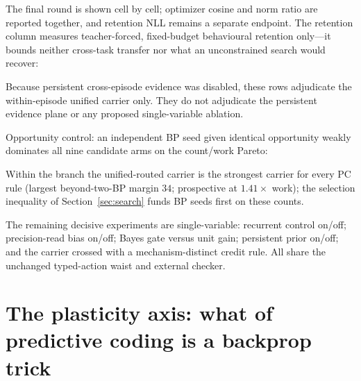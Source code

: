 \documentclass[11pt]{article}
\begin{document}
The final round is shown cell by cell; optimizer cosine and norm ratio are
reported together, and retention NLL remains a separate endpoint. The retention
column measures teacher-forced, fixed-budget behavioural retention only---it bounds
neither cross-task transfer nor what an unconstrained search would recover:
\begin{center}\scriptsize
{}
\end{center}

Because persistent cross-episode evidence was disabled, these rows adjudicate the
within-episode unified carrier only. They do not adjudicate the persistent evidence
plane or any proposed single-variable ablation.

Opportunity control: an independent BP seed given identical opportunity weakly
dominates all nine candidate arms on the count/work Pareto:
\begin{center}\small
{}
\end{center}
Within the branch the unified-routed carrier is the strongest carrier for every PC
rule (largest beyond-two-BP margin $34$; prospective at $1.41\times$ work); the
selection inequality of Section~\ref{sec:search} funds BP seeds first on these
counts.
\fi

The remaining decisive experiments are single-variable: recurrent control on/off;
precision-read bias on/off; Bayes gate versus unit gain; persistent prior on/off; and the
carrier crossed with a mechanism-distinct credit rule. All share the unchanged
typed-action waist and external checker.

\section{The plasticity axis: what of predictive coding is a backprop trick}
\label{sec:plasticity}
\end{document}
